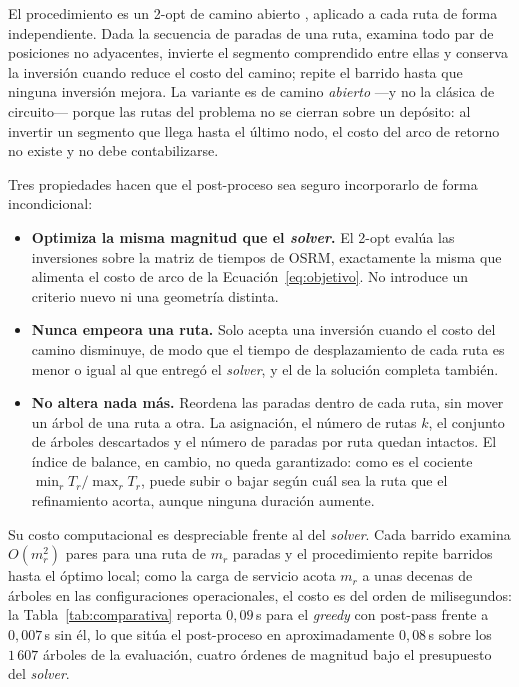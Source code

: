 El procedimiento es un 2-opt de camino abierto \citep{croes1958method,lin1965computer},
aplicado a cada ruta de forma independiente. Dada la secuencia de paradas de una
ruta, examina todo par de posiciones no adyacentes, invierte el segmento comprendido
entre ellas y conserva la inversión cuando reduce el costo del camino; repite el
barrido hasta que ninguna inversión mejora. La variante es de camino \textit{abierto}
---y no la clásica de circuito--- porque las rutas del problema no se cierran sobre
un depósito: al invertir un segmento que llega hasta el último nodo, el costo del
arco de retorno no existe y no debe contabilizarse.

Tres propiedades hacen que el post-proceso sea seguro incorporarlo de forma
incondicional:

\begin{itemize}
  \item \textbf{Optimiza la misma magnitud que el \textit{solver}.} El 2-opt evalúa
        las inversiones sobre la matriz de tiempos de OSRM, exactamente la misma que
        alimenta el costo de arco de la Ecuación~\ref{eq:objetivo}. No introduce un
        criterio nuevo ni una geometría distinta.
  \item \textbf{Nunca empeora una ruta.} Solo acepta una inversión cuando el costo
        del camino disminuye, de modo que el tiempo de desplazamiento de cada ruta
        es menor o igual al que entregó el \textit{solver}, y el de la solución
        completa también.
  \item \textbf{No altera nada más.} Reordena las paradas dentro de cada ruta, sin
        mover un árbol de una ruta a otra. La asignación, el número de rutas $k$, el
        conjunto de árboles descartados y el número de paradas por ruta quedan
        intactos. El índice de balance, en cambio, no queda garantizado: como es el
        cociente $\min_r T_r / \max_r T_r$, puede subir o bajar según cuál sea la
        ruta que el refinamiento acorta, aunque ninguna duración aumente.
\end{itemize}

Su costo computacional es despreciable frente al del \textit{solver}. Cada barrido
examina $O(m_r^2)$ pares para una ruta de $m_r$ paradas y el procedimiento repite
barridos hasta el óptimo local; como la carga de servicio acota $m_r$ a unas
decenas de árboles en las configuraciones operacionales, el costo es del orden de
milisegundos: la Tabla~\ref{tab:comparativa} reporta $0{,}09$\,s para el
\textit{greedy} con post-pass frente a $0{,}007$\,s sin él, lo que sitúa el
post-proceso en aproximadamente $0{,}08$\,s sobre los $1\,607$ árboles de la
evaluación, cuatro órdenes de magnitud bajo el presupuesto del \textit{solver}.

